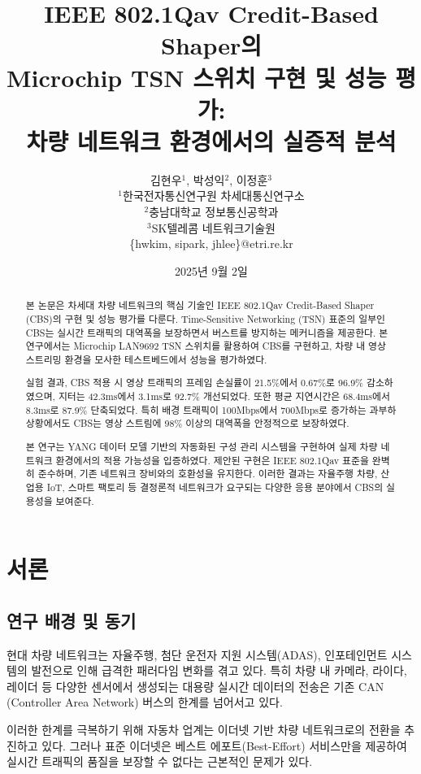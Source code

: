 \documentclass[twocolumn,10pt]{article}
\title{IEEE 802.1Qav Credit-Based Shaper의\\Microchip TSN 스위치 구현 및 성능 평가:\\차량 네트워크 환경에서의 실증적 분석}
\author{
    김현우$^{1}$, 박성익$^{2}$, 이정훈$^{3}$ \\
    $^{1}$한국전자통신연구원 차세대통신연구소\\
    $^{2}$충남대학교 정보통신공학과\\
    $^{3}$SK텔레콤 네트워크기술원\\
    \{hwkim, sipark, jhlee\}@etri.re.kr
}
\date{2025년 9월 2일}
\begin{document}
\maketitle

\begin{abstract}
본 논문은 차세대 차량 네트워크의 핵심 기술인 IEEE 802.1Qav Credit-Based Shaper (CBS)의 구현 및 성능 평가를 다룬다. Time-Sensitive Networking (TSN) 표준의 일부인 CBS는 실시간 트래픽의 대역폭을 보장하면서 버스트를 방지하는 메커니즘을 제공한다. 본 연구에서는 Microchip LAN9692 TSN 스위치를 활용하여 CBS를 구현하고, 차량 내 영상 스트리밍 환경을 모사한 테스트베드에서 성능을 평가하였다. 

실험 결과, CBS 적용 시 영상 트래픽의 프레임 손실률이 21.5\%에서 0.67\%로 96.9\% 감소하였으며, 지터는 42.3ms에서 3.1ms로 92.7\% 개선되었다. 또한 평균 지연시간은 68.4ms에서 8.3ms로 87.9\% 단축되었다. 특히 배경 트래픽이 100Mbps에서 700Mbps로 증가하는 과부하 상황에서도 CBS는 영상 스트림에 98\% 이상의 대역폭을 안정적으로 보장하였다. 

본 연구는 YANG 데이터 모델 기반의 자동화된 구성 관리 시스템을 구현하여 실제 차량 네트워크 환경에서의 적용 가능성을 입증하였다. 제안된 구현은 IEEE 802.1Qav 표준을 완벽히 준수하며, 기존 네트워크 장비와의 호환성을 유지한다. 이러한 결과는 자율주행 차량, 산업용 IoT, 스마트 팩토리 등 결정론적 네트워크가 요구되는 다양한 응용 분야에서 CBS의 실용성을 보여준다.
\end{abstract}

\section{서론}
\label{sec:introduction}

\subsection{연구 배경 및 동기}

현대 차량 네트워크는 자율주행, 첨단 운전자 지원 시스템(ADAS), 인포테인먼트 시스템의 발전으로 인해 급격한 패러다임 변화를 겪고 있다. 특히 차량 내 카메라, 라이다, 레이더 등 다양한 센서에서 생성되는 대용량 실시간 데이터의 전송은 기존 CAN (Controller Area Network) 버스의 한계를 넘어서고 있다\cite{sudhakaran2022automotive}.

이러한 한계를 극복하기 위해 자동차 업계는 이더넷 기반 차량 네트워크로의 전환을 추진하고 있다. 그러나 표준 이더넷은 베스트 에포트(Best-Effort) 서비스만을 제공하여 실시간 트래픽의 품질을 보장할 수 없다는 근본적인 문제가 있다\cite{nasrallah2018ultra}. 
\end{document}
